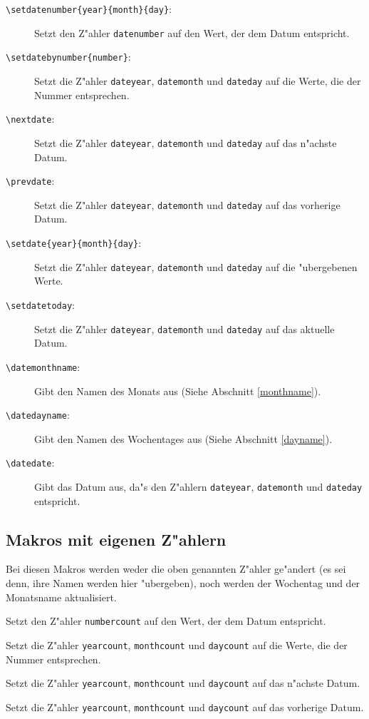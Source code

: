 \documentclass[a4paper,draft]{article}
\begin{document}
\begin{description}
\item[\texttt{\textbackslash setdatenumber\{year\}\{month\}\{day\}}:] Setzt den Z"ahler \texttt{datenumber} auf den Wert, der dem Datum entspricht.
\item[\texttt{\textbackslash setdatebynumber\{number\}}:] Setzt die Z"ahler \texttt{dateyear}, \texttt{datemonth} und \texttt{dateday} auf die Werte, die der Nummer entsprechen.
\item[\texttt{\textbackslash nextdate}:] Setzt die Z"ahler \texttt{dateyear}, \texttt{datemonth} und \texttt{dateday} auf das n"achste Datum.
\item[\texttt{\textbackslash prevdate}:] Setzt die Z"ahler \texttt{dateyear}, \texttt{datemonth} und \texttt{dateday} auf das vorherige Datum.
\item[\texttt{\textbackslash setdate\{year\}\{month\}\{day\}}:] Setzt die Z"ahler \texttt{dateyear}, \texttt{datemonth} und \texttt{dateday} auf die "ubergebenen Werte.
\item[\texttt{\textbackslash setdatetoday}:] Setzt die Z"ahler \texttt{dateyear}, \texttt{datemonth} und \texttt{dateday} auf das aktuelle Datum.
\item[\texttt{\textbackslash datemonthname}:] Gibt den Namen des Monats aus (Siehe Abschnitt \ref{monthname}).
\item[\texttt{\textbackslash datedayname}:] Gibt den Namen des Wochentages aus (Siehe Abschnitt \ref{dayname}).
\item[\texttt{\textbackslash datedate}:] Gibt das Datum aus, da"s den Z"ahlern \texttt{dateyear}, \texttt{datemonth} und \texttt{dateday} entspricht.
\end{description}
\subsection{Makros mit eigenen Z"ahlern}
Bei diesen Makros werden weder die oben genannten Z"ahler ge"andert (es sei denn, ihre Namen werden hier "ubergeben), noch werden der Wochentag und der Monatsname aktualisiert.
\begin{description}\sloppypar
\item[\texttt{\textbackslash setmydatenumber\{numbercount\}\{year\}\{month\}\{day\}}:] Setzt den Z"ahler \texttt{numbercount} auf den Wert, der dem Datum entspricht.
\item[\texttt{\textbackslash setmydatebynumber\{number\}\{yearcount\}\{monthcount\}\{daycount\}}:] Setzt die Z"ahler \texttt{yearcount}, \texttt{monthcount} und \texttt{daycount} auf die Werte, die der Nummer entsprechen.
\item[\texttt{\textbackslash mynextdate\{yearcount\}\{monthcount\}\{daycount\}}:] Setzt die Z"ahler \texttt{yearcount}, \texttt{monthcount} und \texttt{daycount} auf das n"achste Datum.
\item[\texttt{\textbackslash mynextdate\{yearcount\}\{monthcount\}\{daycount\}}:] Setzt die Z"ahler \texttt{yearcount}, \texttt{monthcount} und \texttt{daycount} auf das vorherige Datum.
\end{description}
\end{document}
